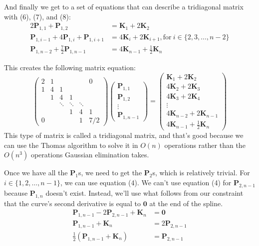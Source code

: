 \documentclass[10pt]{article}
\renewcommand{\vec}[1]{\mathbf{#1}}
\begin{document}
	And finally we get to a set of equations that can describe a tridiagonal
	matrix with (6), (7), and (8):
	\begin{align*}
		2\vec{P}_{1,1} + \vec{P}_{1,2} &= \vec{K}_{1} + 2\vec{K}_{2}\\
		\vec{P}_{1,i-1} + 4\vec{P}_{1,i} + \vec{P}_{1,i+1} &= 4\vec{K}_{i} + 2\vec{K}_{i+1}, \mathrm{for\ } i \in \{2, 3, \dots, n-2\}\\
		\vec{P}_{1,n-2} + \frac{7}{2}\vec{P}_{1,n-1} &= 4\vec{K}_{n-1} + \frac{1}{2}\vec{K}_{n}
	\end{align*}

	This creates the following matrix equation:
	$$
	\begin{pmatrix}
		2 & 1 &   &   &   & 0 \\
		1 & 4 & 1 \\
		\ & 1 & 4 & 1 \\
		\ & \ & \ddots & \ddots & \ddots \\
		\ & \ & \ & 1 & 4 & 1 \\
		0 & \ & \ & \ & 1 & 7/2
	\end{pmatrix}
	\begin{pmatrix}
		\vec{P}_{1,1} \\
		\vec{P}_{1,2} \\
		\vdots \\
		\vec{P}_{1,n-1}
	\end{pmatrix}
	=
	\begin{pmatrix}
		\vec{K}_{1} + 2\vec{K}_{2} \\
		4\vec{K}_{2} + 2\vec{K}_{3} \\
		4\vec{K}_{3} + 2\vec{K}_{4} \\
		\vdots \\
		4\vec{K}_{n-2} + 2\vec{K}_{n-1} \\
		4\vec{K}_{n-1} + \frac{1}{2}\vec{K}_{n}
	\end{pmatrix}
	$$
	This type of matrix is called a tridiagonal matrix, and that's good because
	we can use the Thomas algorithm to solve it in $O(n)$ operations rather than
	the $O(n^{3})$ operations Gaussian elimination takes.

	Once we have all the $\vec{P}_{1}$s, we need to get the $\vec{P}_{2}$s,
	which is relatively trivial. For $i \in \{1, 2, \dots, n - 1\}$, we can use
	equation (4). We can't use equation (4) for $\vec{P}_{2,n-1}$ because
	$\vec{P}_{1,n}$ doesn't exist. Instead, we'll use what follows from our
	constraint that the curve's second derivative is equal to $\vec{0}$ at the end of
	the spline.
	\begin{align}
		\vec{P}_{1,n-1} - 2\vec{P}_{2,n-1} + \vec{K}_{n} &= \vec{0}\nonumber\\
		\vec{P}_{1,n-1} + \vec{K}_{n} &= 2\vec{P}_{2,n-1}\nonumber\\
		\frac{1}{2}(\vec{P}_{1,n-1} + \vec{K}_{n}) &= \vec{P}_{2,n-1}
	\end{align}
\end{document}
